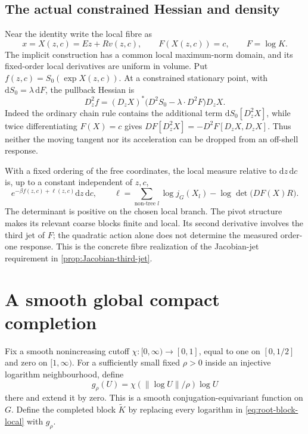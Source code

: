 \documentclass[11pt,oneside,openany]{book}
\theoremstyle{definition}
\theoremstyle{remark}
\newcommand{\dd}{\mathrm d}
\newcommand{\norm}[1]{\left\lVert#1\right\rVert}
\newcommand{\src}[2]{\cite[#2]{#1}}
\begin{document}
\subsection{The actual constrained Hessian and density}
Near the identity write the local fibre as
\[
x=X(z,c)=Ez+Rv(z,c),\qquad F(X(z,c))=c,\qquad F=\log K.
\]
The implicit construction has a common local maximum-norm domain, and
its fixed-order local derivatives are uniform in volume. Put
$f(z,c)=S_0(\exp X(z,c))$. At a constrained stationary point, with
$\dd S_0=\lambda\,\dd F$, the pullback Hessian is
\begin{equation}\label{eq:actual-constrained-Hessian}
D_z^2 f=(D_zX)^*\bigl(D^2S_0-\lambda\cdot D^2F\bigr)D_zX.
\end{equation}
Indeed the ordinary chain rule contains the additional term
$\dd S_0[D_z^2X]$, while twice differentiating $F(X)=c$ gives
$DF[D_z^2X]=-D^2F[D_zX,D_zX]$. Thus neither the moving tangent nor its
acceleration can be dropped from an off-shell response.

With a fixed ordering of the free coordinates, the local measure
relative to $\dd z\,\dd c$ is, up to a constant independent of $z,c$,
\begin{equation}\label{eq:root-local-density}
 e^{-\beta f(z,c)+\ell(z,c)}\dd z\,\dd c,\qquad
 \ell=\sum_{\text{non-tree }l}\log j_G(X_l)
             -\log\det\bigl(DF(X)R\bigr).
\end{equation}
The determinant is positive on the chosen local branch. The pivot
structure makes its relevant coarse blocks finite and local. Its
second derivative involves the third jet of $F$; the quadratic action
alone does not determine the measured order-one response. This is the
concrete fibre realization of the Jacobian-jet requirement in
\cref{prop:Jacobian-third-jet}. \src{F11}{V55, V58--V60}

\section{A smooth global compact completion}
\label{sec:global-pivots}
Fix a smooth nonincreasing cutoff $\chi:[0,\infty)\to[0,1]$, equal to
one on $[0,1/2]$ and zero on $[1,\infty)$. For a sufficiently small
fixed $\rho>0$ inside an injective logarithm neighbourhood, define
\[
 g_\rho(U)=\chi(\norm{\log U}/\rho)\log U
\]
there and extend it by zero. This is a smooth conjugation-equivariant
function on $G$. Define the completed block $\widetilde K$ by replacing
every logarithm in \cref{eq:root-block-local} with $g_\rho$.
\end{document}
